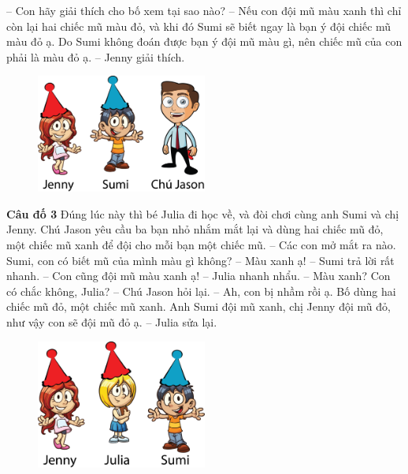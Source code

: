 	-- Con hãy giải thích cho bố xem tại sao nào?
	\vskip 0.1cm
	-- Nếu con đội mũ màu xanh thì chỉ còn lại hai chiếc mũ màu đỏ, và khi đó Sumi sẽ biết ngay là bạn ý đội chiếc mũ màu đỏ ạ. Do Sumi không đoán được bạn ý đội mũ màu gì, nên chiếc mũ của con phải là màu đỏ ạ. – Jenny giải thích.
		\begin{figure}[H]
		\centering
		\vspace*{-5pt}
		\captionsetup{labelformat= empty, justification=centering}
		\includegraphics[width=0.5\textwidth]{h2}
		\vspace*{-10pt}
		\end{figure}
	\textbf{Câu đố 3}
	\vskip 0.1cm
	Đúng lúc này thì bé Julia đi học về, và đòi chơi cùng anh Sumi và chị Jenny. Chú Jason yêu cầu ba bạn nhỏ nhắm mắt lại và dùng hai chiếc mũ đỏ, một chiếc mũ xanh để đội cho mỗi bạn một chiếc mũ.
	\vskip 0.1cm
	-- Các con mở mắt ra nào. Sumi, con có biết mũ của mình màu gì không?
	\vskip 0.1cm
	-- Màu xanh ạ! -- Sumi trả lời rất nhanh.
	\vskip 0.1cm
	-- Con cũng đội mũ màu xanh ạ! -- Julia  nhanh nhẩu.
	\vskip 0.1cm
	-- Màu xanh? Con có chắc không, Julia? -- Chú Jason hỏi lại.
	\vskip 0.1cm
	-- Ah, con bị nhầm rồi ạ. Bố dùng hai chiếc mũ đỏ, một chiếc mũ xanh. Anh Sumi đội mũ xanh, chị Jenny đội mũ đỏ, như vậy con sẽ đội mũ đỏ ạ. – Julia sửa lại.
	\begin{figure}[H]
	\centering
	\vspace*{-5pt}
	\captionsetup{labelformat= empty, justification=centering}
	\includegraphics[width=0.5\textwidth]{h3}
	\vspace*{-10pt}
	\end{figure}
	
